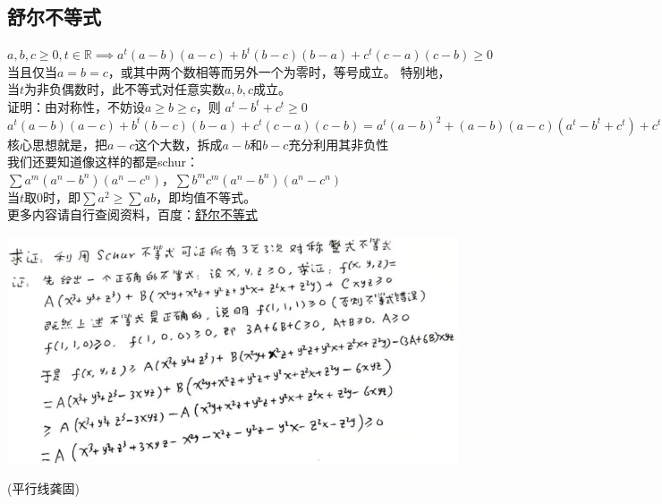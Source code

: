 \documentclass[UTF8]{ctexart}
\begin{document}
\subsection{舒尔不等式}
$ a,b,c \geq 0,t\in \mathbb{R}\implies a^{t}(a-b)(a-c)+b^{t}(b-c)(b-a)+c^{t}(c-a)(c-b)\geq 0$\\当且仅当$ a=b=c $，或其中两个数相等而另外一个为零时，等号成立。
特别地，当$ t $为非负偶数时，此不等式对任意实数$ a,b,c $成立。\\
证明：由对称性，不妨设$ a\geq b\geq c$，则 $a^{t}-b^{t}+c^{t}\geq 0 $\\
$ a^{t}(a-b)(a-c)+b^{t}(b-c)(b-a)+c^{t}(c-a)(c-b)=a^{t}(a-b)^{2}+(a-b)(a-c)(a^{t}-b^{t}+c^{t})+c^{t}(b-c)^{2}\geq 0 $\\
核心思想就是，把$ a-c $这个大数，拆成$ a-b $和$ b-c $充分利用其非负性\\
我们还要知道像这样的都是schur：\\
$\displaystyle  \sum  a^{m}\left(a^{n}-b^{n}\right)\left(a^{n}-c^{n}\right)$，$\displaystyle \sum b^{m} c^{m}\left(a^{n}-b^{n}\right)\left(a^{n}-c^{n}\right)$\\
当$ t $取$ 0 $时，即$ \displaystyle  \sum a^{2}\geq \displaystyle  \sum ab$，即均值不等式。\\
更多内容请自行查阅资料，百度：\href{https://baike.baidu.com/item/%E8%88%92%E5%B0%94%E4%B8%8D%E7%AD%89%E5%BC%8F/4224241?fr=aladdin}{舒尔不等式}
\begin{center}
	\includegraphics[width=0.8\linewidth]{36}
\end{center}
(平行线\quad 龚固)
\end{document}
